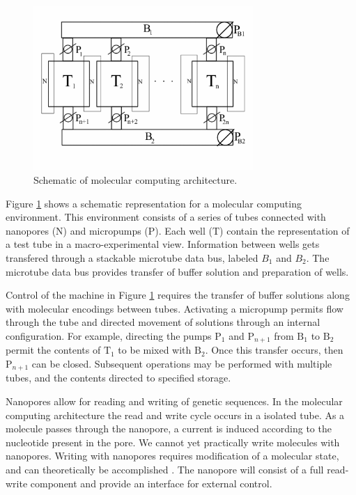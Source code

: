 \begin{figure}[htbp]
\begin{center}

	\includegraphics[width=0.7434\textwidth]{figures/molecularSchematic.png}

\caption{Schematic of molecular computing architecture.}
\label{molecularSchematic}
\end{center}
\end{figure}

\FloatBarrier	
	
Figure \ref{molecularSchematic} shows a schematic representation for a molecular computing environment.  This environment consists of a series of tubes connected with nanopores ($\text{N}$) and micropumps ($\text{P}$).  Each well ($\text{T}$) contain the representation of a test tube in a macro-experimental view.  Information between wells gets transfered through a stackable microtube data bus, labeled $B_1$ and $B_2$.  The microtube data bus provides transfer of buffer solution and preparation of wells.  

Control of the machine in Figure \ref{molecularSchematic} requires the transfer of buffer solutions along with molecular encodings between tubes.  Activating a micropump permits flow through the tube and directed movement of solutions through an internal configuration.  For example, directing the pumps $\text{P}_1$ and $\text{P}_{n+1}$ from $\text{B}_1$ to $\text{B}_2$ permit the contents of $\text{T}_1$ to be mixed with $\text{B}_2$.  Once this transfer occurs, then $\text{P}_{n+1}$ can be closed.  Subsequent operations may be performed with multiple tubes, and the contents directed to specified storage.  

Nanopores allow for reading and writing of genetic sequences.  In the molecular computing architecture the read and write cycle occurs in a isolated tube.  As a molecule passes through the nanopore, a current is induced according to the nucleotide present in the pore.  We cannot yet practically write molecules with nanopores.  Writing with nanopores requires modification of a molecular state, and can theoretically be accomplished \cite{dnaTransistorIBMpressrelease}.  The nanopore will consist of a full read-write component and provide an interface for external control.

